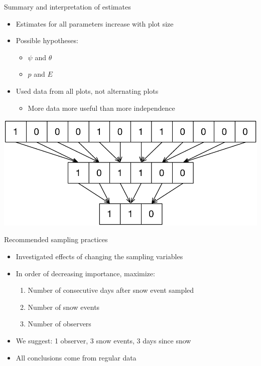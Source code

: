 \documentclass{beamer}
\begin{document}
\begin{frame}{Summary and interpretation of estimates}
	\begin{itemize}
		\item Estimates for all parameters increase with plot size
		\item Possible hypotheses:
		\begin{itemize}
			\item \(\psi\) and \(\theta\)
			\item \(p\) and \(E\)
		\end{itemize}
		\item Used data from all plots, not alternating plots
		\begin{itemize}
			\item More data more useful than more independence
		\end{itemize}
	\end{itemize}
	\begin{center}
		\includegraphics[scale=0.5]{Figures/Diagrams/Aggregation.pdf}
	\end{center}
\end{frame}

\begin{frame}{Recommended sampling practices}
	\begin{itemize}
		\item Investigated effects of changing the sampling variables
		\item In order of decreasing importance, maximize:
		\begin{enumerate}
			\item Number of consecutive days after snow event sampled
			\item Number of snow events
			\item Number of observers
		\end{enumerate}
		\item We suggest: 1 observer, 3 snow events, 3 days since snow
		\item All conclusions come from regular data
	\end{itemize}
\end{frame}
\end{document}

